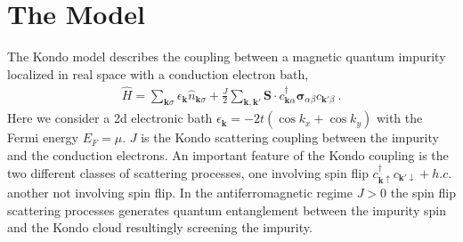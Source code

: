 \documentclass[aps,prx,preprint,groupedaddress]{revtex4-2}
\begin{document}
\section{The Model}
The Kondo model\cite{kondo1964resistance,anderson1970poor} describes the coupling between a magnetic quantum impurity localized in real space with a conduction electron bath,
\begin{eqnarray}
\hat{H} = \sum_{\mathbf{k}\sigma}\epsilon_{\mathbf{k}}\hat{n}_{\mathbf{k}\sigma}+\frac{J}{2}\sum_{\mathbf{k},\mathbf{k}'}\mathbf{S}\cdot c^{\dagger}_{\mathbf{k}\alpha}\boldsymbol{\sigma}_{\alpha\beta}c_{\mathbf{k}'\beta}~.\label{KondoH}
\end{eqnarray}
Here we consider a 2d electronic bath $\epsilon_{\mathbf{k}}=-2t(\cos k_{x}+\cos k_{y})$ with the Fermi energy $E_{F}=\mu$. $J$ is the Kondo scattering coupling between the impurity and the conduction electrons. An important feature of the Kondo coupling is the two different classes of scattering processes, one involving spin flip $c^{\dagger}_{\mathbf{k}\uparrow}c_{\mathbf{k}'\downarrow}+h.c.$ another not involving spin flip. In the antiferromagnetic regime $J>0$ the spin flip scattering processes generates quantum entanglement between the impurity spin and the Kondo cloud resultingly screening the impurity.
\end{document}
